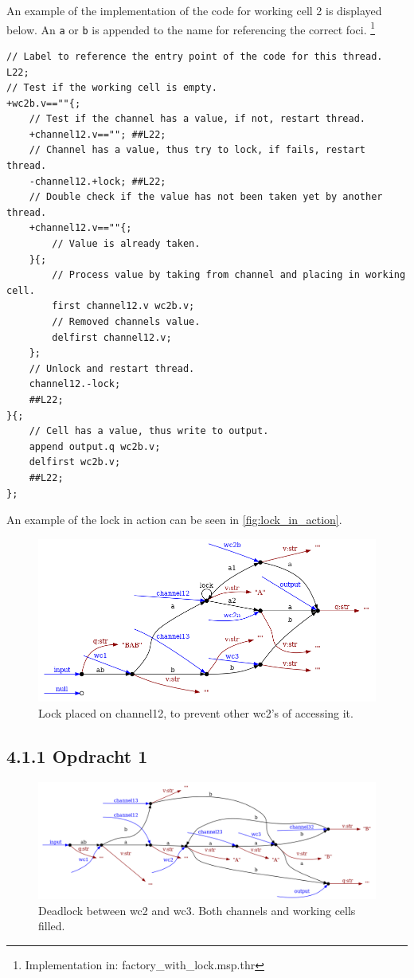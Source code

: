 \documentclass[a4paper,12px]{article}
\begin{document}
An example of the implementation of the code for working cell 2 is displayed below. An \verb|a| or \verb|b| is appended to the name for referencing the correct foci. \footnote{Implementation in: factory\_with\_lock.msp.thr}

\begin{verbatim}
// Label to reference the entry point of the code for this thread.
L22;
// Test if the working cell is empty.
+wc2b.v==""{;
    // Test if the channel has a value, if not, restart thread.
    +channel12.v==""; ##L22;
    // Channel has a value, thus try to lock, if fails, restart thread.
    -channel12.+lock; ##L22;
    // Double check if the value has not been taken yet by another thread.
    +channel12.v==""{;
        // Value is already taken.
    }{;
        // Process value by taking from channel and placing in working cell.
        first channel12.v wc2b.v;
        // Removed channels value.
        delfirst channel12.v;
    };
    // Unlock and restart thread.
    channel12.-lock;
    ##L22;
}{;
    // Cell has a value, thus write to output.
    append output.q wc2b.v;
    delfirst wc2b.v;
    ##L22;
};
\end{verbatim}

An example of the lock in action can be seen in \autoref{fig:lock_in_action}.
\begin{figure}[h]
    \centering
    \includegraphics[width=\linewidth]{lock_in_action.png}
    \caption{Lock placed on channel12, to prevent other wc2's of accessing it.}
    \label{fig:lock_in_action}
\end{figure}
\FloatBarrier%

\subsection{4.1.1 Opdracht 1}

\begin{figure}[h]
    \centering
    \includegraphics[width=\linewidth]{deadlock.png}
    \caption{Deadlock between wc2 and wc3. Both channels and working cells filled.}
    \label{fig:deadlock}
\end{figure}
\FloatBarrier%
\end{document}
